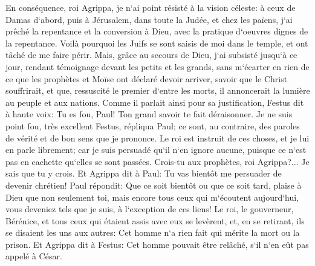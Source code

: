 \verse En conséquence, roi Agrippa, je n`ai point résisté à la vision céleste: 
\verse à ceux de Damas d`abord, puis à Jérusalem, dans toute la Judée, et chez les païens, j`ai prêché la repentance et la conversion à Dieu, avec la pratique d`oeuvres dignes de la repentance. 
\verse Voilà pourquoi les Juifs se sont saisis de moi dans le temple, et ont tâché de me faire périr. 
\verse Mais, grâce au secours de Dieu, j`ai subsisté jusqu`à ce jour, rendant témoignage devant les petits et les grands, sans m`écarter en rien de ce que les prophètes et Moïse ont déclaré devoir arriver, 
\verse savoir que le Christ souffrirait, et que, ressuscité le premier d`entre les morts, il annoncerait la lumière au peuple et aux nations. 
\verse Comme il parlait ainsi pour sa justification, Festus dit à haute voix: Tu es fou, Paul! Ton grand savoir te fait déraisonner. 
\verse Je ne suis point fou, très excellent Festus, répliqua Paul; ce sont, au contraire, des paroles de vérité et de bon sens que je prononce. 
\verse Le roi est instruit de ces choses, et je lui en parle librement; car je suis persuadé qu`il n`en ignore aucune, puisque ce n`est pas en cachette qu`elles se sont passées. 
\verse Crois-tu aux prophètes, roi Agrippa?... Je sais que tu y crois. 
\verse Et Agrippa dit à Paul: Tu vas bientôt me persuader de devenir chrétien! 
\verse Paul répondit: Que ce soit bientôt ou que ce soit tard, plaise à Dieu que non seulement toi, mais encore tous ceux qui m`écoutent aujourd`hui, vous deveniez tels que je suis, à l`exception de ces liens! 
\verse Le roi, le gouverneur, Bérénice, et tous ceux qui étaient assis avec eux se levèrent, 
\verse et, en se retirant, ils se disaient les uns aux autres: Cet homme n`a rien fait qui mérite la mort ou la prison. 
\verse Et Agrippa dit à Festus: Cet homme pouvait être relâché, s`il n`en eût pas appelé à César. 

